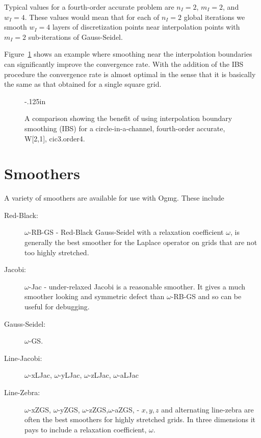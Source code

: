 \documentclass[12pt]{article}
\begin{document}
Typical values for a fourth-order accurate problem are $n_I=2$, $m_I=2$, and $w_I=4$. 
These values would mean that for each of $n_I=2$ global iterations we
smooth $w_I=4$ layers of discretization points near interpolation points with $m_I=2$ sub-iterations of Gauss-Seidel.

Figure~\ref{fig:smoothInterp} shows an example where smoothing near the interpolation boundaries
can significantly improve the convergence rate. With the addition of the IBS procedure the convergence rate
is almost optimal in the sense that it is basically the same as that obtained for a single square grid.

\begin{figure}[hbt]
\begin{center}
\vglue-.125in
\end{center}
\caption{A comparison showing the benefit of using interpolation boundary smoothing (IBS)
 for a circle-in-a-channel, fourth-order accurate, W[2,1], cic3.order4.}
\label{fig:smoothInterp}
\end{figure}






\clearpage
\section{Smoothers}

  A variety of smoothers are available for use with Ogmg. These include
\begin{description}
  \item[Red-Black:] $\omega$-RB-GS - Red-Black Gauss-Seidel with a relaxation coefficient $\omega$,
     is generally the
     best smoother for the Laplace operator on grids that are not too highly stretched.
  \item[Jacobi:] $\omega$-Jac - under-relaxed Jacobi is a reasonable smoother. It gives a much smoother
     looking and symmetric defect than $\omega$-RB-GS and so can be useful for debugging.
  \item[Gauss-Seidel:] $\omega$-GS. 
  \item[Line-Jacobi:] $\omega$-xLJac, $\omega$-yLJac, $\omega$-zLJac, $\omega$-aLJac
  \item[Line-Zebra:] $\omega$-xZGS, $\omega$-yZGS, $\omega$-zZGS,$ \omega$-aZGS, - 
    $x,y,z$ and alternating line-zebra are often the best smoothers 
    for highly stretched grids. In three dimensions it pays to include a relaxation coefficient, $\omega$.
\end{description}
\end{document}
